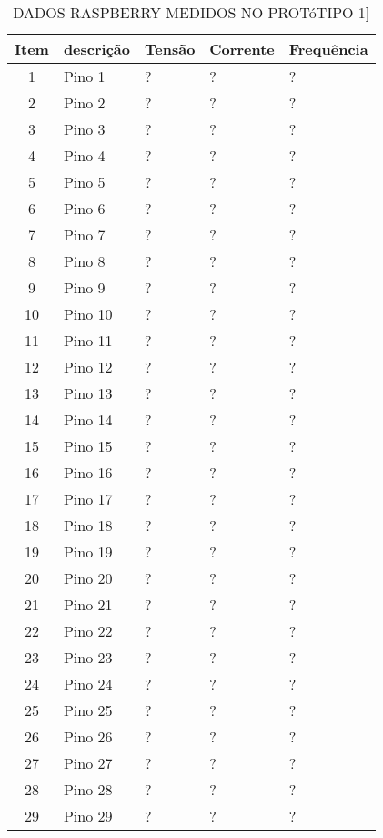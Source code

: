 \begin{table}
	\centering
	\caption{DADOS RASPBERRY MEDIDOS NO PROTóTIPO 1]}
	\begin{tabular}{ |c | p{3cm}| p{3cm} |p{3cm} | p{3cm} | } \hline
		\textbf{ Item} 	   & \textbf{descrição}	&\textbf{Tensão} &\textbf{Corrente} &\textbf{Frequência} \\ \hline
		
		1  & Pino 1 & ? & ? & ?\\ \hline
		2  & Pino 2 & ? & ? & ? \\ \hline
		3  & Pino 3 & ? & ? & ? \\ \hline
		4  & Pino 4 & ? & ? & ? \\ \hline
		5  & Pino 5 & ? & ? & ? \\ \hline
		6  & Pino 6 & ? & ? & ? \\ \hline
		7  & Pino 7 & ? & ? & ? \\ \hline
		8  & Pino 8 & ? & ? & ? \\ \hline
		9  & Pino 9 & ? & ? & ? \\ \hline
		10 & Pino 10 & ? & ? & ? \\ \hline
		11 & Pino 11 & ? & ? & ? \\ \hline
		12 & Pino 12 & ? & ? & ? \\ \hline
		13 & Pino 13 & ? & ? & ? \\ \hline	
		14 & Pino 14 & ? & ? & ?\\ \hline
		15 & Pino 15 & ? & ? & ? \\ \hline
		16 & Pino 16 & ? & ? & ? \\ \hline
		17 & Pino 17 & ? & ? & ? \\ \hline
		18 & Pino 18 & ? & ? & ? \\ \hline
		19 & Pino 19 & ? & ? & ? \\ \hline
		20 & Pino 20 & ? & ? & ? \\ \hline
		21 & Pino 21 & ? & ? & ? \\ \hline
		22 & Pino 22 & ? & ? & ? \\ \hline
		23 & Pino 23 & ? & ? & ? \\ \hline
		24 & Pino 24 & ? & ? & ? \\ \hline
		25 & Pino 25 & ? & ? & ? \\ \hline
		26 & Pino 26 & ? & ? & ? \\ \hline		
		27 & Pino 27 & ? & ? & ?\\ \hline
		28 & Pino 28 & ? & ? & ? \\ \hline
		29 & Pino 29 & ? & ? & ? \\ \hline

\end{tabular}
\end{table}
